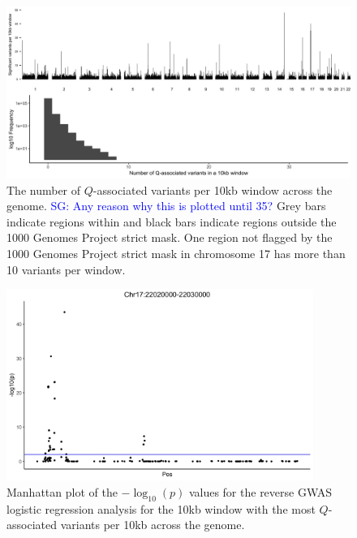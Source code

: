 \documentclass[9pt,lineno]{template}
\newcommand{\sgcomment}[1]{\textcolor{blue}{SG: #1}}
\begin{document}
\begin{figure}[tbp]
\centering
\includegraphics[width=15cm,keepaspectratio]{../Figures/VariantDensity.jpg}
\caption{The number of $Q$-associated variants per 10kb window across the genome. \sgcomment{Any reason why this is plotted until 35?}
Grey bars indicate regions within and black bars indicate regions outside the 1000 Genomes Project strict mask.
One region not flagged by the 1000 Genomes Project strict mask in chromosome 17 has more than 10 variants per window.}  
\label{VariantDensity}
\end{figure}

\begin{figure}[tbp]
\centering
\includegraphics[width=10cm,keepaspectratio]{../Figures/RegionOver10.jpg}
\caption{Manhattan plot of the $-\log_{10}(p)$ values for the reverse GWAS logistic regression analysis for the 10kb window with the most  $Q$-associated variants per 10kb across the genome.}  
\label{Top10}
\end{figure}
\end{document}
